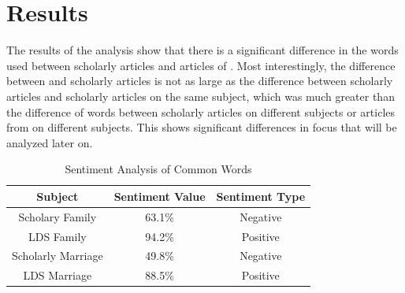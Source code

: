 \documentclass[twocolumn]{article}
\begin{document}
\section{Results}
The results of the analysis show that there is a significant difference in the words used between scholarly articles and articles of \church. Most interestingly, the difference between \church and scholarly articles is not as large as the difference between scholarly articles and scholarly articles on the same subject, which was much greater than the difference of words between scholarly articles on different subjects or articles from \church on different subjects. This shows significant differences in focus that will be analyzed later on.
\begin{table}[h] %
    \centering
    \caption{Sentiment Analysis of Common Words}
    \label{tab:example}
    \begin{tabular}{|c|c|c|} %
        \hline
        \textbf{Subject}   & \textbf{Sentiment Value} & \textbf{Sentiment Type} \\ %
        \hline
        Scholary Family    & 63.1\%                   & Negative                \\ %
        \hline

        LDS Family         & 94.2\%                   & Positive                \\ %
        \hline

        Scholarly Marriage & 49.8\%                   & Negative                \\ %
        \hline

        LDS Marriage       & 88.5\%                   & Positive                \\ %

        \hline
    \end{tabular}
\end{table}
\end{document}
